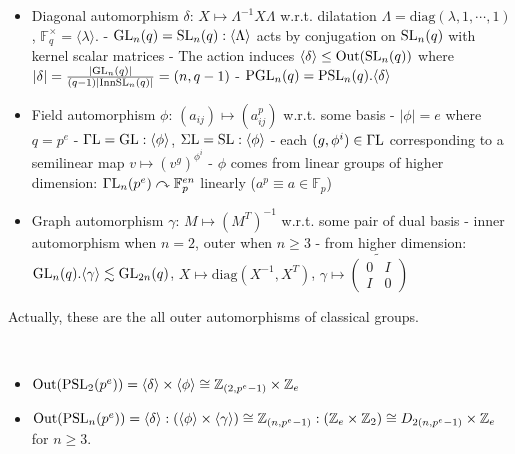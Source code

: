 \documentclass[a4paper,11pt]{article}
\begin{document}
\begin{itemize}
    \item Diagonal automorphism $\delta$: $X\mapsto \Lambda^{-1} X\Lambda$ w.r.t. dilatation $\Lambda=\mathrm{diag}(\lambda,1,\cdots,1)$, $\mathbb{F}_q^\times=\langle \lambda\rangle$.
        \subitem- $\mathrm{GL}_n(q)=\mathrm{SL}_n(q):\langle \Lambda\rangle$ acts by conjugation on $\mathrm{SL}_n(q)$ with kernel scalar matrices
        \subitem- The action induces $\langle\delta\rangle\leq \mathrm{Out}(\mathrm{SL}_n(q))$ where $|\delta|=\frac{|\mathrm{GL}_n(q)|}{(q-1)|\mathrm{Inn} \mathrm{SL}_n(q)|}=(n,q-1)$
        \subitem- $\mathrm{PGL}_n(q)=\mathrm{PSL}_n(q).\langle \delta\rangle$ 
    \item Field automorphism $\phi$: $(a_{ij})\mapsto (a_{ij}^p)$ w.r.t. some basis
        \subitem- $|\phi|=e$ where $q=p^e$
        \subitem- $\mathrm{\Gamma L}=\mathrm{GL}:\langle \phi\rangle$, $\mathrm{\Sigma L}=\mathrm{SL}:\langle \phi\rangle$
        \subitem- each $(g,\phi^i)\in\mathrm{\Gamma L}$ corresponding to a semilinear map $v\mapsto (v^g)^{\phi^i}$
        \subitem- $\phi$ comes from linear groups of higher dimension: $\mathrm{\Gamma L}_n(p^e)\curvearrowright\mathbb{F}_p^{en}$ linearly ($a^p\equiv a\in\mathbb{F}_p$)
    \item Graph automorphism $\gamma$: $M\mapsto (M^T)^{-1}$ w.r.t. some pair of dual basis
        \subitem- inner automorphism when $n=2$, outer when $n\geq 3$
        \subitem- from higher dimension: $\mathrm{GL}_n(q).\langle\gamma\rangle\lesssim \mathrm{GL}_{2n}(q)$, $X\mapsto\mathrm{diag}(X^{-1},X^T)$, $\gamma\mapsto\widetilde{\left(\begin{smallmatrix}
            0 & I\\  I & 0
        \end{smallmatrix}\right)}$
\end{itemize}

Actually, these are the all outer automorphisms of classical groups.

\begin{theorem}\ 
    \begin{itemize}
        \item $\mathrm{Out}(\mathrm{PSL}_2(p^e))=\langle \delta\rangle\times \langle \phi\rangle\cong \mathbb{Z}_{(2,p^e-1)}\times\mathbb{Z}_e$ 
        \item $\mathrm{Out}(\mathrm{PSL}_n(p^e))=\langle \delta\rangle:(\langle \phi\rangle\times \langle\gamma\rangle)\cong \mathbb{Z}_{(n,p^e-1)}:(\mathbb{Z}_e\times\mathbb{Z}_2)\cong D_{2(n,p^e-1)}\times \mathbb{Z}_e$ for $n\geq 3$.
    \end{itemize}
\end{theorem}
\end{document}
